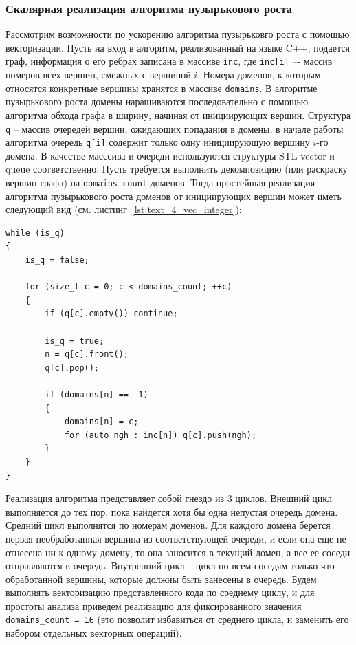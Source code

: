 \subsubsection{Скалярная реализация алгоритма пузырькового роста}

Рассмотрим возможности по ускорению алгоритма пузырьковго роста с помощью векторизации.
Пусть на вход в алгоритм, реализованный на языке C++, подается граф, информация о его ребрах записана в массиве \texttt{inc}, где \texttt{inc[i]} –- массив номеров всех вершин, смежных с вершиной $i$.
Номера доменов\label{term:domain6}, к которым относятся конкретные вершины хранятся в массиве \texttt{domains}.
В алгоритме пузырькового роста домены наращиваются последовательно с помощью алгоритма обхода графа в ширину, начиная от инициирующих вершин.
Структура \texttt{q} -- массив очередей вершин, ожидающих попадания в домены, в начале работы алгоритма очередь \texttt{q[i]} содержит только одну инициирующую вершину $i$-го домена.
В качестве масссива и очереди используются структуры STL\label{abbr:stl} vector и queue соответственно.
Пусть требуется выполнить декомпозицию (или раскраску вершин графа) на \texttt{domains\_count} доменов.
Тогда простейшая реализация алгоритма пузырькового роста доменов от инициирующих вершин может иметь следующий вид (см. листинг~\ref{lst:text_4_vec_integer}):

\begin{lstlisting}[caption={Реализация алгоритма пузырькового роста доменов.},label={lst:text_4_vec_integer}]
while (is_q)
{
    is_q = false;

    for (size_t c = 0; c < domains_count; ++c)
    {
        if (q[c].empty()) continue;

        is_q = true;
        n = q[c].front();
        q[c].pop();

        if (domains[n] == -1)
        {
            domains[n] = c;
            for (auto ngh : inc[n]) q[c].push(ngh);
        }
    }
}
\end{lstlisting}

Реализация алгоритма представляет собой гнездо из 3 циклов.
Внешний цикл выполняется до тех пор, пока найдется хотя бы одна непустая очередь домена.
Средний цикл выполнятся по номерам доменов.
Для каждого домена берется первая необработанная вершина из соответствующей очереди, и если она еще не отнесена ни к одному домену, то она заносится в текущий домен, а все ее соседи отправляются в очередь.
Внутренний цикл -- цикл по всем соседям только что обработанной вершины, которые должны быть занесены в очередь.
Будем выполнять векторизацию представленного кода по среднему циклу, и для простоты анализа приведем реализацию для фиксированного значения \texttt{domains\_count = 16} (это позволит избавиться от среднего цикла, и заменить его набором отдельных векторных операций).

